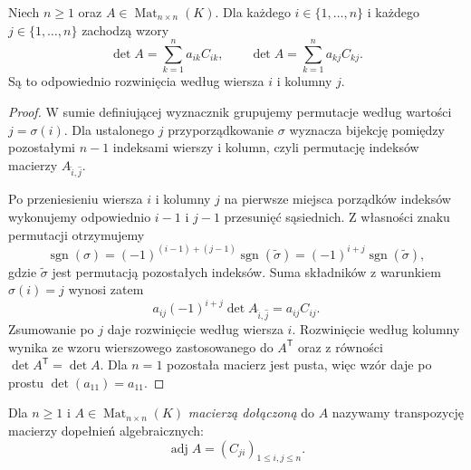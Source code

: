 \begin{twierdzenie}
\label{thm:lin6-laplace}
Niech \(n\geq1\) oraz
\(A\in\operatorname{Mat}_{n\times n}(K)\).
Dla każdego \(i\in\{1,\ldots,n\}\)
i każdego \(j\in\{1,\ldots,n\}\)
zachodzą wzory
\[
 \det A=\sum_{k=1}^{n} a_{ik}C_{ik},
 \qquad
 \det A=\sum_{k=1}^{n} a_{kj}C_{kj}.
\]
Są to odpowiednio rozwinięcia
według wiersza \(i\) i kolumny \(j\).
\end{twierdzenie}
\begin{proof}
W sumie definiującej wyznacznik
grupujemy permutacje według wartości
\(j=\sigma(i)\). Dla ustalonego \(j\)
przyporządkowanie \(\sigma\)
wyznacza bijekcję pomiędzy pozostałymi
\(n-1\) indeksami wierszy i kolumn,
czyli permutację indeksów macierzy
\(A_{\widehat i,\widehat j}\).

Po przeniesieniu wiersza \(i\)
i kolumny \(j\) na pierwsze miejsca
porządków indeksów wykonujemy odpowiednio
\(i-1\) i \(j-1\) przesunięć sąsiednich.
Z własności znaku permutacji
otrzymujemy
\[
 \operatorname{sgn}(\sigma)
 =(-1)^{(i-1)+(j-1)}
  \operatorname{sgn}(\widetilde\sigma)
 =(-1)^{i+j}
  \operatorname{sgn}(\widetilde\sigma),
\]
gdzie \(\widetilde\sigma\) jest
permutacją pozostałych indeksów.
Suma składników z warunkiem
\(\sigma(i)=j\) wynosi zatem
\[
 a_{ij}(-1)^{i+j}
 \det A_{\widehat i,\widehat j}
 =a_{ij}C_{ij}.
\]
Zsumowanie po \(j\) daje rozwinięcie
według wiersza \(i\).
Rozwinięcie według kolumny wynika
ze wzoru wierszowego zastosowanego
do \(A^{\mathsf T}\) oraz z równości
\(\det A^{\mathsf T}=\det A\).
Dla \(n=1\) pozostała macierz jest
pusta, więc wzór daje po prostu
\(\det(a_{11})=a_{11}\).
\end{proof}

\begin{definicja}
\label{def:lin6-dolaczona}
Dla \(n\geq1\) i
\(A\in\operatorname{Mat}_{n\times n}(K)\)
\emph{macierzą dołączoną} do \(A\)
nazywamy transpozycję macierzy
dopełnień algebraicznych:
\[
 \operatorname{adj}A=(C_{ji})_{1\leq i,j\leq n}.
\]
\end{definicja}


